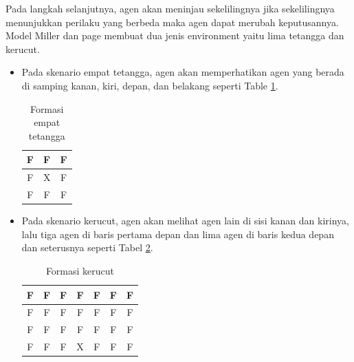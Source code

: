 Pada langkah selanjutnya, agen akan meninjau sekelilingnya jika sekelilingnya menunjukkan perilaku yang berbeda maka agen dapat merubah keputusannya. Model Miller dan page membuat dua jenis environment yaitu lima tetangga dan kerucut.

\begin{itemize}
	\item Pada skenario empat tetangga, agen akan memperhatikan agen yang berada di samping kanan, kiri, depan, dan belakang seperti Table \ref{tbl:formasi_sop}.

	\begin{table}[H]
		\centering
		\begin{tabular}{|c|c|c|}
			\hline
			F & \cellcolor{gray!30}F & F \\
			\hline
			\cellcolor{gray!30}F & \cellcolor{gray!50}X & \cellcolor{gray!30}F \\
			\hline
			F & \cellcolor{gray!30}F & F \\
			\hline
		\end{tabular}
		\caption{Formasi empat tetangga}
		\label{tbl:formasi_sop}
	\end{table}

	\item Pada skenario kerucut, agen akan melihat agen lain di sisi kanan dan kirinya, lalu tiga agen di baris pertama depan dan lima agen di baris kedua depan dan seterusnya seperti Tabel \ref{tbl:formasi_kerucut}.

	\begin{table}[H]
		\centering
		\begin{tabular}{|c|c|c|c|c|c|c|}
			\hline
			\cellcolor{gray!30}F & \cellcolor{gray!30}F & \cellcolor{gray!30}F & \cellcolor{gray!30}F & \cellcolor{gray!30}F & \cellcolor{gray!30}F & \cellcolor{gray!30}F \\
			\hline
			F & \cellcolor{gray!30}F & \cellcolor{gray!30}F & \cellcolor{gray!30}F & \cellcolor{gray!30}F & \cellcolor{gray!30}F & F \\
			\hline
			F & F & \cellcolor{gray!30}F & \cellcolor{gray!30}F & \cellcolor{gray!30}F & F & F \\
			\hline
			F & F & \cellcolor{gray!30}F & \cellcolor{gray!50}X & \cellcolor{gray!30}F & F & F \\
			\hline
		\end{tabular}
		\caption{Formasi kerucut}
		\label{tbl:formasi_kerucut}
	\end{table}
\end{itemize}

